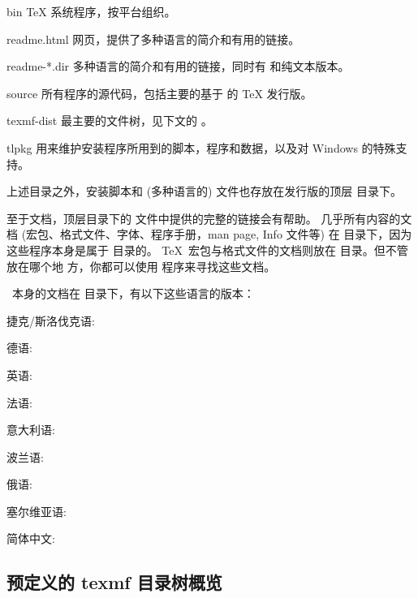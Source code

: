 \documentclass{article}
\begin{document}
\begin{ttdescription}
\item[bin] \TeX{} 系统程序，按平台组织。
%
\item[readme.html] 网页，提供了多种语言的简介和有用的链接。
\item[readme-*.dir] \TL{} 多种语言的简介和有用的链接，同时有 \HTML{}
和纯文本版本。

%
\item[source] 所有程序的源代码，包括主要的基于 \Webc{} 的 \TeX{}
  发行版。
%
\item[texmf-dist] 最主要的文件树，见下文的 。
%
\item[tlpkg] 用来维护安装程序所用到的脚本，程序和数据，以及对
Windows 的特殊支持。
\end{ttdescription}

上述目录之外，安装脚本和 (多种语言的)  文件也存放在发行版的顶层
目录下。

至于文档，顶层目录下的  文件中提供的完整的链接会有帮助。
几乎所有内容的文档 (宏包、格式文件、字体、程序手册，man page, Info 文件等) 在
 目录下，因为这些程序本身是属于  目录的。
\TeX\ 宏包与格式文件的文档则放在  目录。但不管放在哪个地
方，你都可以使用  程序来寻找这些文档。

\TL\ 本身的文档在  目录下，有以下这些语言的版本：

\begin{itemize*}
\item{捷克/斯洛伐克语:} 
\item{德语:} 
\item{英语:} 
\item{法语:} 
\item{意大利语:} 
\item{波兰语:} 
\item{俄语:} 
\item{塞尔维亚语:} 
\item{简体中文:} 
\end{itemize*}


\subsection{预定义的 texmf 目录树概览}
\label{sec:texmftrees}
\end{document}
